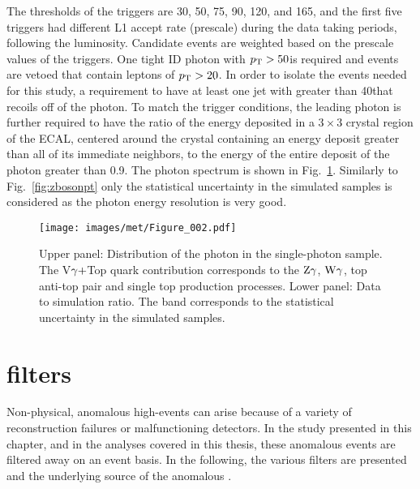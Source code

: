 The \pt thresholds of the triggers are 30, 50, 75, 90, 120, and 165\GeV, and the first five triggers had different L1 accept rate (prescale) during the data taking periods, following the luminosity. 
Candidate events are weighted based on the prescale values of the triggers.
One tight ID photon with $p_{\mathrm{T}} > 50$\GeV is required and events are vetoed that contain leptons of $p_{\mathrm{T}} > 20$\GeV. 
In order to isolate the events needed for this study, a requirement to have at least one jet with \pt greater than 40\GeV that recoils off of the photon. 
To match the trigger conditions, the leading photon is further required to have the ratio of the energy deposited in a $3\times3$ crystal region of the ECAL, centered around the crystal containing an energy deposit greater than all of its immediate neighbors, to the energy of the entire deposit of the photon greater than 0.9.
The photon \qt spectrum is shown in Fig.~\ref{fig:gbosonpt}. 
Similarly to Fig.~\ref{fig:zbosonpt} only the statistical uncertainty in the simulated samples is considered as the photon energy resolution is very good.
\begin{figure}[!htb]
  \centering
  \texttt{[image: images/met/Figure\_002.pdf]}
  \caption{Upper panel: Distribution of the photon \qt in the single-photon sample. The V$\gamma+$Top quark contribution corresponds to the $\mathrm{Z}\gamma$, $\mathrm{W}\gamma$, top anti-top pair and single top production processes. Lower panel: Data to simulation ratio. The band corresponds to the statistical uncertainty in the simulated samples.  }
  \label{fig:gbosonpt}
\end{figure}                                                                                                                                                                 
\section{\ptmiss filters}                                                                                                                                     
\noindent
\justify
\label{sec:filters}
Non-physical, anomalous high-\ptmiss events can arise because of a variety of reconstruction failures or malfunctioning detectors.  
In the \ptmiss study presented in this chapter, and in the analyses covered in this thesis, these anomalous \ptmiss events are filtered away on an event basis. 
In the following, the various filters are presented and the underlying source of the anomalous \ptmiss. 
